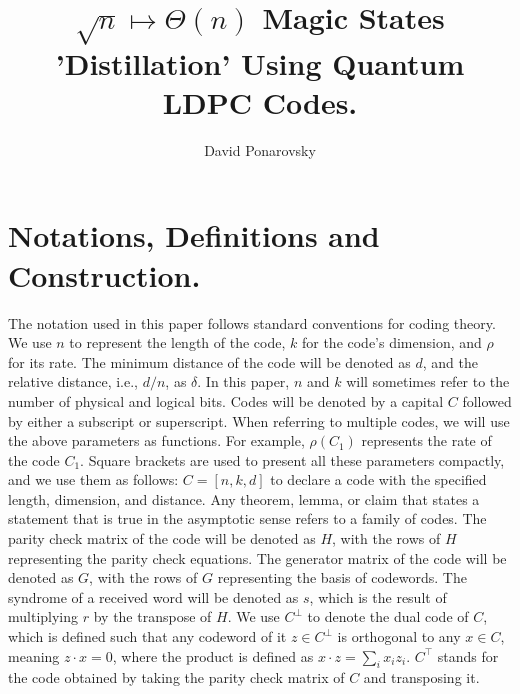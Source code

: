 \documentclass[manuscript,screen,review]{acmart}
\begin{document}

\title{ $\sqrt{n} \mapsto \Theta(n)$  Magic States 'Distillation' Using
Quantum LDPC Codes. }
\author{David Ponarovsky}
\maketitle

\newcommand*{\Mbas}{\mathcal{X}^\prime}
\newcommand*{\sMbas}{\text{span }\Mbas}
\newcommand*{\QQ}{C_{X}/C_{Z}^\perp }
\newcommand*{\trig}{Triorthogonal }
\newcommand*{\Hyp}{Hyperproduct }
\newcommand*{\Cin}{ C_{\text{initial}} }
\newcommand*{\Ctan}{ C_{\text{Tanner}} }


\section{Notations, Definitions and Construction.} The notation used in this paper follows standard conventions for coding theory. We use $n$ to represent the length of the code, $k$ for the code's dimension, and $\rho$ for its rate. The minimum distance of the code will be denoted as $d$, and the relative distance, i.e., $d/n$, as $\delta$. In this paper, $n$ and $k$ will sometimes refer to the number of physical and logical bits. Codes will be denoted by a capital $C$ followed by either a subscript or superscript. When referring to multiple codes, we will use the above parameters as functions. For example, $\rho(C_{1})$ represents the rate of the code $C_{1}$. Square brackets are used to present all these parameters compactly, and we use them as follows: $C=[n,k,d]$ to declare a code with the specified length, dimension, and distance. Any theorem, lemma, or claim that states a statement that is true in the asymptotic sense refers to a family of codes. The parity check matrix of the code will be denoted as $H$, with the rows of $H$ representing the parity check equations. The generator matrix of the code will be denoted as $G$, with the rows of $G$ representing the basis of codewords. The syndrome of a received word will be denoted as $s$, which is the result of multiplying $r$ by the transpose of $H$. We use $C^\perp$ to denote the dual code of $C$, which is defined such that any codeword of it $z\in C^\perp$ is orthogonal to any $x\in C$, meaning $z\cdot x = 0$, where the product is defined as $x\cdot z = \sum_{i}{x_{i}z_{i}}$. $C^{\top}$ stands for the code obtained by taking the parity check matrix of $C$ and transposing it.
\end{document}
